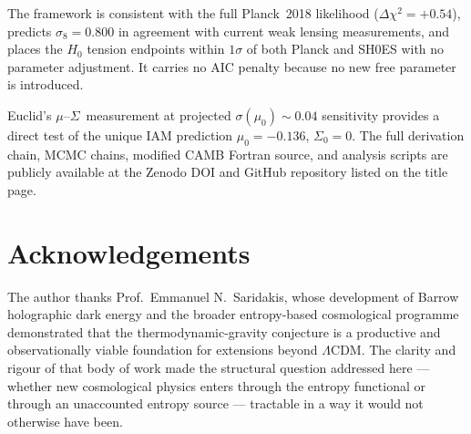 \documentclass[12pt]{article}
\newcommand{\LCDM}{$\Lambda$CDM}
\newcommand{\musig}{$\mu$--$\Sigma$}
\begin{document}
The framework is consistent with the full Planck~2018 likelihood
($\Delta\chi^2 = +0.54$), predicts $\sigma_8 = 0.800$ in agreement with current
weak lensing measurements, and places the $H_0$ tension endpoints within $1\sigma$
of both Planck and SH0ES with no parameter adjustment.  It carries no AIC penalty
because no new free parameter is introduced.

Euclid's \musig\ measurement at projected $\sigma(\mu_0)\sim0.04$ sensitivity
provides a direct test of the unique IAM prediction $\mu_0 = -0.136$,
$\Sigma_0 = 0$.  The full derivation chain, MCMC chains, modified CAMB Fortran
source, and analysis scripts are publicly available at the Zenodo DOI and GitHub
repository listed on the title page.

\section*{Acknowledgements}

The author thanks Prof.\ Emmanuel N.\ Saridakis, whose development of Barrow
holographic dark energy and the broader entropy-based cosmological programme
demonstrated that the thermodynamic-gravity conjecture is a productive and
observationally viable foundation for extensions beyond \LCDM.  The clarity
and rigour of that body of work made the structural question addressed here ---
whether new cosmological physics enters through the entropy functional or through
an unaccounted entropy source --- tractable in a way it would not otherwise have been.
\end{document}

